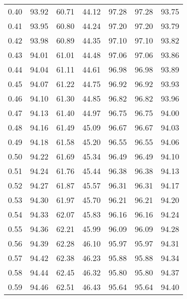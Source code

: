 \begin{tabular}{|c|c|c|c|c|c|c|}
      0.40 &     93.92 &     60.71 &      44.12 &   97.28 &      97.28 &         93.75 \\
      0.41 &     93.95 &     60.80 &      44.24 &   97.20 &      97.20 &         93.79 \\
      0.42 &     93.98 &     60.89 &      44.35 &   97.10 &      97.10 &         93.82 \\
      0.43 &     94.01 &     61.01 &      44.48 &   97.06 &      97.06 &         93.86 \\
      0.44 &     94.04 &     61.11 &      44.61 &   96.98 &      96.98 &         93.89 \\
      0.45 &     94.07 &     61.22 &      44.75 &   96.92 &      96.92 &         93.93 \\
      0.46 &     94.10 &     61.30 &      44.85 &   96.82 &      96.82 &         93.96 \\
      0.47 &     94.13 &     61.40 &      44.97 &   96.75 &      96.75 &         94.00 \\
      0.48 &     94.16 &     61.49 &      45.09 &   96.67 &      96.67 &         94.03 \\
      0.49 &     94.18 &     61.58 &      45.20 &   96.55 &      96.55 &         94.06 \\
      0.50 &     94.22 &     61.69 &      45.34 &   96.49 &      96.49 &         94.10 \\
      0.51 &     94.24 &     61.76 &      45.44 &   96.38 &      96.38 &         94.13 \\
      0.52 &     94.27 &     61.87 &      45.57 &   96.31 &      96.31 &         94.17 \\
      0.53 &     94.30 &     61.97 &      45.70 &   96.21 &      96.21 &         94.20 \\
      0.54 &     94.33 &     62.07 &      45.83 &   96.16 &      96.16 &         94.24 \\
      0.55 &     94.36 &     62.21 &      45.99 &   96.09 &      96.09 &         94.28 \\
      0.56 &     94.39 &     62.28 &      46.10 &   95.97 &      95.97 &         94.31 \\
      0.57 &     94.42 &     62.38 &      46.23 &   95.88 &      95.88 &         94.34 \\
      0.58 &     94.44 &     62.45 &      46.32 &   95.80 &      95.80 &         94.37 \\
      0.59 &     94.46 &     62.51 &      46.43 &   95.64 &      95.64 &         94.40 \\

\end{tabular}

